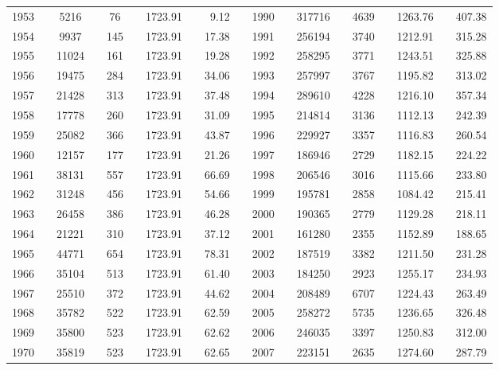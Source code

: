 \begin{table}[]
\begin{tabular}{llccccrrrlllccccrrr}
1953 &  & 5216 &  & 76 &  & 1723.91 &  & 9.12 &  & 1990 &  & 317716 &  & 4639 &  & 1263.76 &  & 407.38 \\
1954 &  & 9937 &  & 145 &  & 1723.91 &  & 17.38 &  & 1991 &  & 256194 &  & 3740 &  & 1212.91 &  & 315.28 \\
1955 &  & 11024 &  & 161 &  & 1723.91 &  & 19.28 &  & 1992 &  & 258295 &  & 3771 &  & 1243.51 &  & 325.88 \\
1956 &  & 19475 &  & 284 &  & 1723.91 &  & 34.06 &  & 1993 &  & 257997 &  & 3767 &  & 1195.82 &  & 313.02 \\
1957 &  & 21428 &  & 313 &  & 1723.91 &  & 37.48 &  & 1994 &  & 289610 &  & 4228 &  & 1216.10 &  & 357.34 \\
1958 &  & 17778 &  & 260 &  & 1723.91 &  & 31.09 &  & 1995 &  & 214814 &  & 3136 &  & 1112.13 &  & 242.39 \\
1959 &  & 25082 &  & 366 &  & 1723.91 &  & 43.87 &  & 1996 &  & 229927 &  & 3357 &  & 1116.83 &  & 260.54 \\
1960 &  & 12157 &  & 177 &  & 1723.91 &  & 21.26 &  & 1997 &  & 186946 &  & 2729 &  & 1182.15 &  & 224.22 \\
1961 &  & 38131 &  & 557 &  & 1723.91 &  & 66.69 &  & 1998 &  & 206546 &  & 3016 &  & 1115.66 &  & 233.80 \\
1962 &  & 31248 &  & 456 &  & 1723.91 &  & 54.66 &  & 1999 &  & 195781 &  & 2858 &  & 1084.42 &  & 215.41 \\
1963 &  & 26458 &  & 386 &  & 1723.91 &  & 46.28 &  & 2000 &  & 190365 &  & 2779 &  & 1129.28 &  & 218.11 \\
1964 &  & 21221 &  & 310 &  & 1723.91 &  & 37.12 &  & 2001 &  & 161280 &  & 2355 &  & 1152.89 &  & 188.65 \\
1965 &  & 44771 &  & 654 &  & 1723.91 &  & 78.31 &  & 2002 &  & 187519 &  & 3382 &  & 1211.50 &  & 231.28 \\
1966 &  & 35104 &  & 513 &  & 1723.91 &  & 61.40 &  & 2003 &  & 184250 &  & 2923 &  & 1255.17 &  & 234.93 \\
1967 &  & 25510 &  & 372 &  & 1723.91 &  & 44.62 &  & 2004 &  & 208489 &  & 6707 &  & 1224.43 &  & 263.49 \\
1968 &  & 35782 &  & 522 &  & 1723.91 &  & 62.59 &  & 2005 &  & 258272 &  & 5735 &  & 1236.65 &  & 326.48 \\
1969 &  & 35800 &  & 523 &  & 1723.91 &  & 62.62 &  & 2006 &  & 246035 &  & 3397 &  & 1250.83 &  & 312.00 \\
1970 &  & 35819 &  & 523 &  & 1723.91 &  & 62.65 &  & 2007 &  & 223151 &  & 2635 &  & 1274.60 &  & 287.79 \\

\end{tabular}
\end{table}
